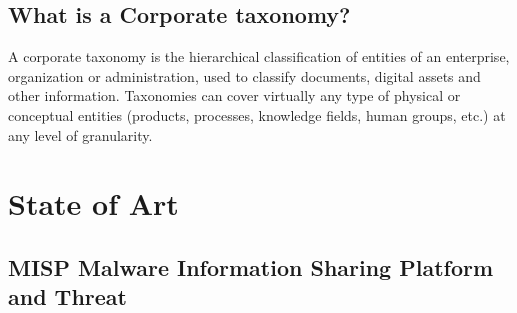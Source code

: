 \documentclass[12pt]{report}
\begin{document}
\vspace{\baselineskip}
\subsection*{What is a Corporate taxonomy?}
A corporate taxonomy is the hierarchical classification of entities of an enterprise, organization or administration, used to classify documents, digital assets and other information. Taxonomies can cover virtually any type of physical or conceptual entities (products, processes, knowledge fields, human groups, etc.) at any level of granularity.\par



\newpage

\vspace{\baselineskip}\section*{State of Art}
\subsection*{MISP Malware Information Sharing Platform and Threat }

\vspace{\baselineskip}
\end{document}
